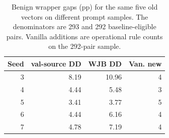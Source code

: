 \begin{table}[t]
\centering
\small
\setlength{\tabcolsep}{3pt}
\begin{tabular}{rrrr}
\toprule
Seed & val-source DD & WJB DD & Van. new \\
\midrule
3 & 8.19 & 10.96 & 4 \\
4 & 4.44 & 5.48 & 3 \\
5 & 3.41 & 3.77 & 5 \\
6 & 4.44 & 6.16 & 4 \\
7 & 4.78 & 7.19 & 4 \\
\bottomrule
\end{tabular}
\caption{Benign wrapper gaps (pp) for the same five old vectors on different prompt samples. The denominators are 293 and 292 baseline-eligible pairs. Vanilla additions are operational rule counts on the 292-pair sample.}
\label{tab:c2}
\end{table}
